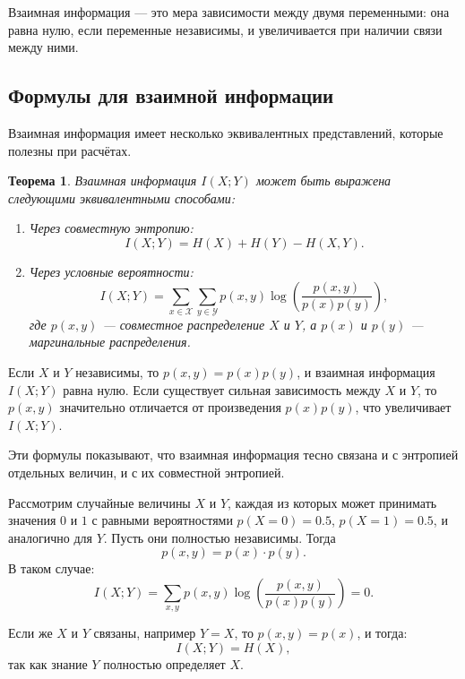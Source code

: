 \documentclass[12pt,a4paper]{article}
\newtheorem{theorem}{Теорема}[section]
\newenvironment{thmbox}[1][]{%
  \begin{tcolorbox}[enhanced, breakable, colback=thmcolor, colframe=blue!50!black, title=#1, fonttitle=\bfseries, arc=3pt, boxrule=0.5pt]
}{\end{tcolorbox}}
\newenvironment{exbox}[1][]{%
  \begin{tcolorbox}[enhanced, breakable, colback=excolor, colframe=brown!50!black, title=#1, fonttitle=\bfseries, arc=3pt, boxrule=0.5pt]
}{\end{tcolorbox}}
\newenvironment{rembox}[1][]{%
  \begin{tcolorbox}[enhanced, breakable, colback=gray!5, colframe=gray!50, title=#1, fonttitle=\bfseries, arc=3pt, boxrule=0.5pt]
}{\end{tcolorbox}}
\begin{document}
Взаимная информация — это мера зависимости между двумя переменными: она равна нулю, если переменные независимы, и увеличивается при наличии связи между ними.

\subsection{Формулы для взаимной информации}

Взаимная информация имеет несколько эквивалентных представлений, которые полезны при расчётах.

\begin{thmbox}[Формулы взаимной информации]
\begin{theorem}
Взаимная информация $I(X; Y)$ может быть выражена следующими эквивалентными способами:
\begin{enumerate}
    \item Через совместную энтропию:
    \[
    I(X; Y) = H(X) + H(Y) - H(X, Y).
    \]
    \item Через условные вероятности:
    \[
    I(X; Y) = \sum_{x \in \mathcal{X}} \sum_{y \in \mathcal{Y}} p(x,y) \log\left(\frac{p(x,y)}{p(x)p(y)}\right),
    \]
    где $p(x,y)$ — совместное распределение $X$ и $Y$, а $p(x)$ и $p(y)$ — маргинальные распределения.
\end{enumerate}
\end{theorem}
\end{thmbox}

\begin{rembox}[Объяснение в терминах вероятности]
Если $X$ и $Y$ независимы, то $p(x,y) = p(x)p(y)$, и взаимная информация $I(X; Y)$ равна нулю. Если существует сильная зависимость между $X$ и $Y$, то $p(x,y)$ значительно отличается от произведения $p(x)p(y)$, что увеличивает $I(X; Y)$.
\end{rembox}

Эти формулы показывают, что взаимная информация тесно связана и с энтропией отдельных величин, и с их совместной энтропией.

\begin{exbox}[Пример расчёта взаимной информации]
Рассмотрим случайные величины $X$ и $Y$, каждая из которых может принимать значения $0$ и $1$ с равными вероятностями $p(X=0) = 0.5$, $p(X=1) = 0.5$, и аналогично для $Y$. Пусть они полностью независимы. Тогда
\[
p(x,y) = p(x) \cdot p(y).
\]
В таком случае:
\[
I(X; Y) = \sum_{x,y} p(x,y) \log \left( \frac{p(x,y)}{p(x)p(y)} \right) = 0.
\]

Если же $X$ и $Y$ связаны, например $Y = X$, то $p(x,y) = p(x)$, и тогда:
\[
I(X; Y) = H(X),
\]
так как знание $Y$ полностью определяет $X$.
\end{exbox}
\end{document}
